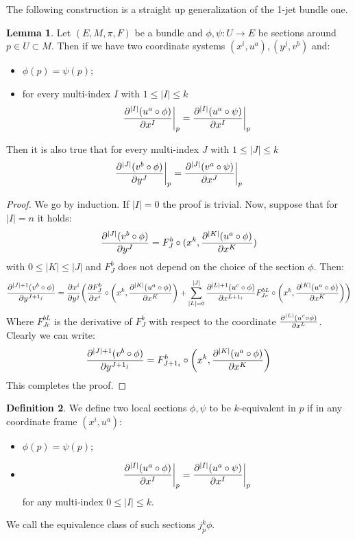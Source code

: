\documentclass[12pt,a4paper]{report}
\theoremstyle{definition}
\newtheorem{Def}{Definition}[chapter]
\theoremstyle{Theorem}
\newtheorem{Lm}[Def]{Lemma}
\theoremstyle{definition}
\theoremstyle{definition}
\begin{document}
	The following construction is a straight up generalization of the 1-jet bundle one.
	\begin{Lm}
		Let $(E,M,\pi,F)$ be a bundle and $\phi,\psi:U\rightarrow E$ be sections around $p\in U\subset M$. Then if we have two coordinate systems $(x^i,u^a),(y^j,v^b)$ and:
		\begin{itemize}
			\item $\phi(p)=\psi(p)$;
			\item for every multi-index $I$ with $1\leq |I|\leq k$
			$${\partial^{|I|} (u^a\circ \phi)\over \partial x^I}\bigg|_p={\partial^{|I|} (u^a\circ \psi)\over \partial x^I}\bigg|_p$$
		\end{itemize}
		Then it is also true that for every multi-index $J$ with $1\leq |J|\leq k$
		$${\partial^{|J|} (v^b\circ \phi)\over \partial y^J}\bigg|_p={\partial^{|J|} (v^a\circ \psi)\over \partial x^J}\bigg|_p$$
	\end{Lm}
	\begin{proof}
		We go by induction. If $|I|=0$ the proof is trivial. Now, suppose that for $|I|=n$ it holds:
		$${\partial^{|J|}(v^b\circ \phi)\over \partial y^J }=F^b_J\circ(x^k,{\partial^{|K|} (u^a\circ \phi)\over \partial x^K})$$
		with $0\leq |K|\leq |J|$ and $F^b_J$ does not depend on the choice of the section $\phi$. Then:
		$${\partial^{|J|+1}(v^b\circ \phi)\over \partial y^{J+1_j} }={\partial x^i\over \partial y^j}\bigg({\partial F^b_J\over \partial x^i}\circ\bigg(x^k,{\partial^{|K|} (u^a\circ \phi)\over \partial x^K}\bigg)+\sum_{|L|=0}^{|J|}{\partial^{|L|+1}(u^c\circ \phi)\over \partial x^{L+1_i}} F^{bL}_{Jc}\circ\bigg(x^k,{\partial^{|K|} (u^a\circ \phi)\over \partial x^K}\bigg)\bigg)$$
		Where $F^{bL}_{Jc}$ is the derivative of $F^b_J$ with respect to the coordinate ${\partial^{|L|}(u^c\circ \phi)\over \partial x^{L}}$. Clearly we can write:
		$${\partial^{|J|+1}(v^b\circ \phi)\over \partial y^{J+1_j} }=F^b_{J+1_i}\circ \bigg(x^k,{\partial^{|K|} (u^a\circ \phi)\over \partial x^K}\bigg)$$
		This completes the proof.
	\end{proof}
	\begin{Def}
		We define two local sections $\phi,\psi$ to be $k$-equivalent in $p$ if in any coordinate frame $(x^i,u^a)$:
		\begin{itemize}
			\item $\phi(p)=\psi(p)$;
			\item $${\partial^{|I|} (u^a\circ \phi)\over \partial x^I}\bigg|_p={\partial^{|I|} (u^a\circ \psi)\over \partial x^I}\bigg|_p$$
			for any multi-index $0\leq |I|\leq k$.
		\end{itemize}
		We call the equivalence class of such sections $j^k_p\phi.$
	\end{Def}
\end{document}
